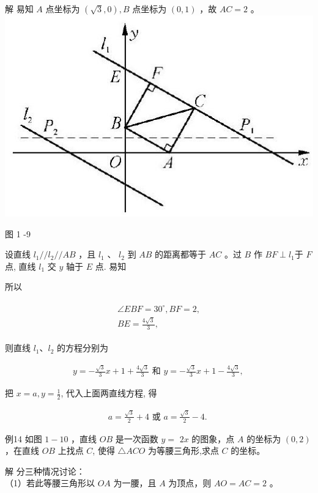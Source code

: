\documentclass[10pt]{article}
\begin{document}
解 易知 $A$ 点坐标为 $(\sqrt{3}, 0), B$ 点坐标为 $(0,1)$ ，故 $A C=2$ 。\\
\includegraphics[max width=\textwidth, center]{2024_10_30_1bf34f7aeb61f11d11d3g-019}

图 1 -9

设直线 $l_{1} / / l_{2} / / A B$ ，且 $l_{1}$ 、 $l_{2}$ 到 $A B$ 的距离都等于 $A C$ 。过 $B$ 作 $B F \perp l_{1}$于 $F$ 点, 直线 $l_{1}$ 交 $y$ 轴于 $E$ 点. 易知

所以

\begin{align*}
\begin{gathered}
\angle E B F=30^{\circ}, B F=2, \\
B E=\frac{4 \sqrt{3}}{3},
\end{gathered}
\end{align*}

则直线 $l_{1} 、 l_{2}$ 的方程分别为

\begin{align*}
y=-\frac{\sqrt{3}}{3} x+1+\frac{4 \sqrt{3}}{3} \text { 和 } y=-\frac{\sqrt{3}}{3} x+1-\frac{4 \sqrt{3}}{3} \text {, }
\end{align*}

把 $x=a, y=\frac{1}{2}$, 代入上面两直线方程, 得

\begin{align*}
a=\frac{\sqrt{3}}{2}+4 \text { 或 } a=\frac{\sqrt{3}}{2}-4 \text {. }
\end{align*}

例14 如图 $1-10$ ，直线 $O B$ 是一次函数 $y=$ $2 x$ 的图象，点 $A$ 的坐标为 $(0,2)$ ，在直线 $O B$ 上找点 $C$, 使得 $\triangle A C O$ 为等腰三角形,求点 $C$ 的坐标。

解 分三种情况讨论：\\
（1）若此等腰三角形以 $O A$ 为一腰，且 $A$ 为顶点，则 $A O=A C=2$ 。
\end{document}
